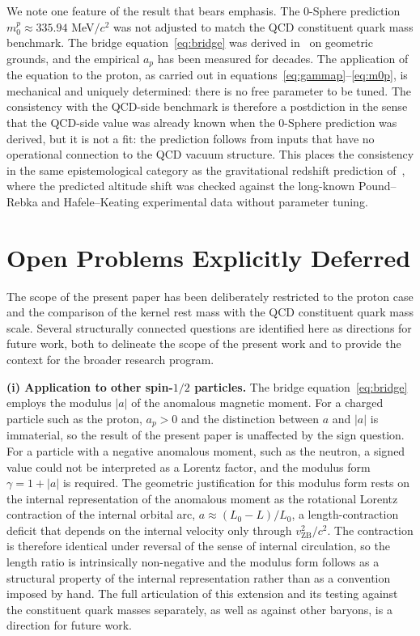 \documentclass[%
 reprint, amsmath,amssymb, aps, prc, ]{revtex4-2}
\numberwithin{equation}{section}
\newcommand{\vZB}{v_{\text{ZB}}}
\begin{document}
We note one feature of the result that bears emphasis.
The 0-Sphere prediction $m_0^p \approx 335.94$ MeV$/c^2$ was not adjusted to match the QCD constituent quark mass benchmark.
The bridge equation~\eqref{eq:bridge} was derived in~\cite{Hanamura10} on geometric grounds, and the empirical $a_p$ has been measured for decades.
The application of the equation to the proton, as carried out in equations~\eqref{eq:gammap}--\eqref{eq:m0p}, is mechanical and uniquely determined: there is no free parameter to be tuned.
The consistency with the QCD-side benchmark is therefore a postdiction in the sense that the QCD-side value was already known when the 0-Sphere prediction was derived, but it is not a fit: the prediction follows from inputs that have no operational connection to the QCD vacuum structure.
This places the consistency in the same epistemological category as the gravitational redshift prediction of~\cite{Hanamura22}, where the predicted altitude shift was checked against the long-known Pound--Rebka and Hafele--Keating experimental data without parameter tuning.

\section{Open Problems Explicitly Deferred}
\label{sec:open}

The scope of the present paper has been deliberately restricted to the proton case and the comparison of the kernel rest mass with the QCD constituent quark mass scale.
Several structurally connected questions are identified here as directions for future work, both to delineate the scope of the present work and to provide the context for the broader research program.

\textbf{(i) Application to other spin-$1/2$ particles.}
The bridge equation~\eqref{eq:bridge} employs the modulus $|a|$ of the anomalous magnetic moment.
For a charged particle such as the proton, $a_p > 0$ and the distinction between $a$ and $|a|$ is immaterial, so the result of the present paper is unaffected by the sign question.
For a particle with a negative anomalous moment, such as the neutron, a signed value could not be interpreted as a Lorentz factor, and the modulus form $\gamma = 1 + |a|$ is required.
The geometric justification for this modulus form rests on the internal representation of the anomalous moment as the rotational Lorentz contraction of the internal orbital arc, $a \approx (L_0 - L)/L_0$, a length-contraction deficit that depends on the internal velocity only through $\vZB^2/c^2$.
The contraction is therefore identical under reversal of the sense of internal circulation, so the length ratio is intrinsically non-negative and the modulus form follows as a structural property of the internal representation rather than as a convention imposed by hand.
The full articulation of this extension and its testing against the constituent quark masses separately, as well as against other baryons, is a direction for future work.
\end{document}
